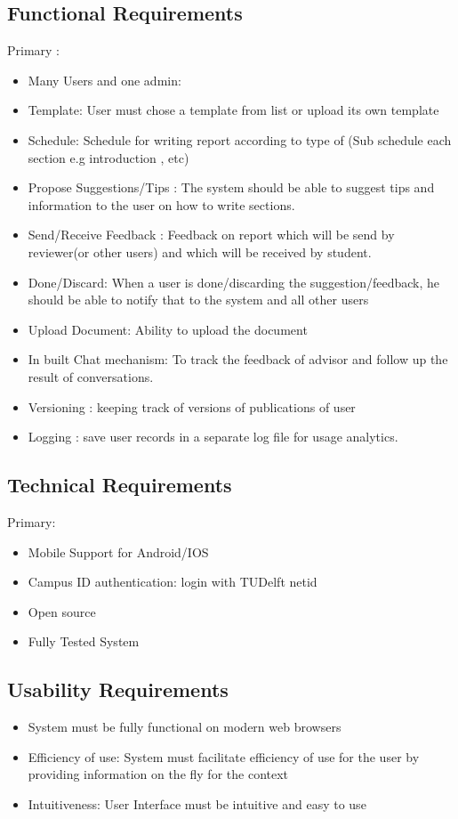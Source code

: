 \subsection{Functional Requirements} %
\label{sub:functional_requirement}
Primary :
\begin{itemize}
	\item Many Users and one admin:
	\item Template: User must chose a template from list or upload its own template
	\item Schedule: Schedule for writing report according to type of  (Sub schedule each section e.g introduction , etc)
	\item Propose Suggestions/Tips : The system should be able to suggest tips and information to the user on how to write sections.
	\item Send/Receive Feedback : Feedback on report which will be send by reviewer(or other users) and which will be received by student.
	\item Done/Discard: When a user is done/discarding the suggestion/feedback, he should be able to notify that to the system and all other users 
	\item Upload Document: Ability to upload the document
	\item In built Chat mechanism: To track the feedback of advisor and follow up the result of conversations. 
	\item Versioning : keeping track of versions of publications of user
	\item Logging : save user records in a separate log file for usage analytics.
\end{itemize}

\subsection{Technical Requirements} %
Primary:
\label{sub:technical_requirements}
\begin{itemize}
	\item Mobile Support for Android/IOS
	\item Campus ID authentication: login with TUDelft netid
	\item Open source
 	\item Fully Tested System 
	 
\end{itemize}


\subsection{Usability Requirements} %
\label{sub:usability_requirements}
\begin{itemize}
	\item System must be fully functional on modern web browsers
	\item Efficiency of use: System must facilitate efficiency of use for the user by providing information on the fly for the context
	\item Intuitiveness: User Interface must be intuitive and easy to use
\end{itemize}
